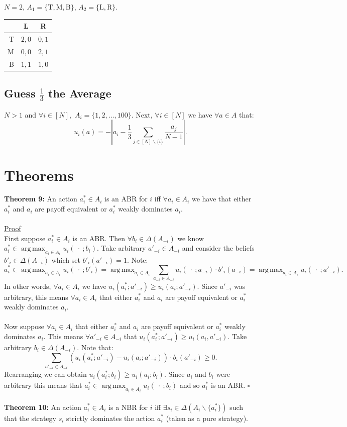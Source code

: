 \documentclass[11pt]{article}
\DeclareMathOperator*{\argmax}{arg\,max}
\theoremstyle{definition}
\theoremstyle{plain}
\begin{document}
$N = 2$, $A_1 =\{\text{T}, \text{M}, \text{B}\}$, $A_2 =\{\text{L}, \text{R}\}$.

\begin{center}
\begin{tabular}{r|c|c|}
  & L & R  \\\hline
T & $2, 0$ & $0, 1$ \\\hline
M & $0, 0$ & $2, 1$ \\\hline
B & $1, 1$ & $1, 0$ \\\hline
\end{tabular}
\end{center}


\subsection*{Guess $\frac{1}{3}$ the Average}

$N >1$ and $\forall i \in [N],$ $A_i = \{1, 2, \ldots, 100\}$. Next, $\forall i \in [N]$ we have $\forall a \in A$ that:
$$u_i(a) = -\left|a_i - \frac{1}{3}\sum_{j \in [N] \backslash \{i\}} \frac{a_j}{N-1} \right|.$$


\section{Theorems}
\textbf{Theorem 9:} An action $a^*_i \in A_i$ is an ABR for $i$ iff $\forall a_i \in A_i$ we have that either $a^*_i$ and $a_i$ are payoff equivalent or $a^*_i$ weakly dominates $a_i$.
\\
\\
\underline{Proof}
\\
First suppose $a_i^* \in A_i$ is an ABR. Then $\forall b_i \in \Delta(A_{-i})$ we know $a_i^* \in \argmax_{a_i \in A_i} u_i( \ \cdot \ ; b_i)$. Take arbitrary $a'_{-i} \in A_{-i}$ and consider the beliefs $b'_i\in \Delta(A_{-i})$ which set $b'_i(a'_{-i})=1$. Note: 
$$a_i^* \in \argmax_{a_i \in A_i} u_i( \ \cdot \ ; b'_i)=\argmax_{a_i \in A_i} \sum_{a_{-i} \in A_{-i}}u_i( \ \cdot \ ;a_{-i}) \cdot b'_i(a_{-i})=\argmax_{a_i \in A_{i}} u_i( \ \cdot \ ;a'_{-i}).$$
In other words, $\forall a_i \in A_i$ we have $u_i(a^*_i;a'_{-i}) \geq u_i(a_i;a'_{-i})$. Since $a'_{-i}$ was arbitrary, this means $\forall a_i \in A_i$ that either $a^*_i$ and $a_i$ are payoff equivalent or $a^*_i$ weakly dominates $a_i$.
\\
\\
Now suppose $\forall a_i\in A_i$ that either $a^*_i$ and $a_i$ are payoff equivalent or $a^*_i$ weakly dominates $a_i$. This means $\forall a'_{-i} \in A_{-i}$ that $u_i(a^*_i;a'_{-i}) \geq u_i(a_i, a'_{-i})$. Take arbitrary $b_i \in \Delta(A_{-i})$. Note that:
$$\sum_{a'_{-i} \in A_{-i}} \left(u_i(a^*_i;a'_{-i})-u_i(a_i; a'_{-i})\right)\cdot b_i(a'_{-i}) \geq 0.$$
Rearranging we can obtain $u_i(a^*_i;b_i)\geq u_i(a_i;b_i).$
Since $a_i$ and $b_i$ were arbitrary this means that $a^*_i \in \argmax_{a_i \in A_i} u_i(\ \cdot \ ; b_i)$ and so $a^*_i$ is an ABR. $\square$
\\
\\
\textbf{Theorem 10:} An action $a^*_i \in A_i$ is a NBR for $i$ iff $\exists s_i \in \Delta(A_i \backslash\{a^*_i\})$ such that the strategy $s_i$ strictly dominates the action $a^*_i$ (taken as a pure strategy).
\end{document}
